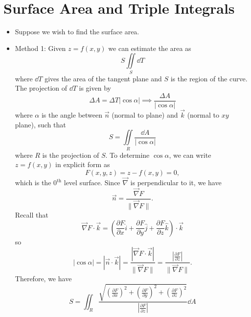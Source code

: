 \section{Surface Area and Triple Integrals}
\begin{itemize}
    \item Suppose we wish to find the surface area. 
    \item Method 1: Given $z=f(x,y)$ we can estimate the area as 
    \begin{equation}
        S \iint\limits_{S}\dd{T}
    \end{equation}
    where $\dd{T}$ gives the area of the tangent plane and $S$ is the region of the curve. The projection of $\dd{T}$ is given by 
    \begin{equation}
        \Delta A = \Delta T |\cos\alpha | \implies \frac{\Delta A}{|\cos\alpha|}
    \end{equation}
    where $\alpha$ is the angle between $\vec{n}$ (normal to plane) and $\vec{k}$ (normal to $xy$ plane), such that 
    \begin{equation}
        S = \iint\limits_R \frac{\dd{A}}{|\cos\alpha|}
    \end{equation}
    where $R$ is the projection of $S$. To determine $\cos\alpha$, we can write $z=f(x,y)$ in explicit form as 
    \begin{equation}
        F(x,y,z) = z-f(x,y) = 0,
    \end{equation}
    which is the $0^\text{th}$ level surface. Since $\vec{\nabla}$ is perpendicular to it, we have 
    \begin{equation}
        \vec{n} = \frac{\vec{\nabla} F}{\lVert \vec{\nabla} F \rVert}.
    \end{equation}
    Recall that 
    \begin{equation}
        \vec{\nabla} F \cdot \vec{k} = \left(\frac{\partial F}{\partial x}\hat{i} + \frac{\partial F}{\partial y}\hat{j}+\frac{\partial F}{\partial z}\hat{k}\right)\cdot \vec{k}
    \end{equation}
    so 
    \begin{equation}
        \boxed{|\cos \alpha| = |\vec{n}\cdot \vec{k}| = \frac{|\vec{\nabla} F \cdot \vec{k}|}{\lVert \vec{\nabla} F\rVert} = \frac{\left|\frac{\partial F}{\partial z}\right|}{\lVert \vec{\nabla} F\rVert}}.
    \end{equation}
    Therefore, we have 
    \begin{equation}
        S = \iint_R \frac{\sqrt{\left(\frac{\partial F}{\partial x}\right)^2+\left(\frac{\partial F}{\partial y}\right)^2+\left(\frac{\partial F}{\partial z}\right)^2}}{\left|\frac{\partial F}{\partial z}\right|}\dd{A}

\end{equation}
\end{itemize}
